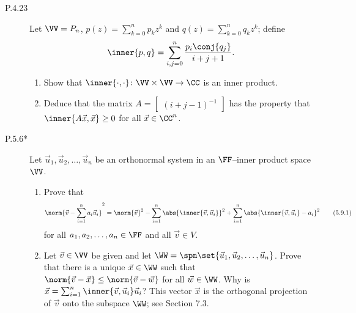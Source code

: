 \documentclass{homework}
\begin{document}
\begin{description}
\item[P.4.23]
  Let \(\VV = P_n\), \(p(z) = \sum_{k=0}^n p_k z^k\) and
  \(q(z) = \sum_{k=0}^n q_k z^k\); define
  \[
    \inner{p, q} = \sum_{i,j=0}^n \frac{p_i \conj{q_j}}{i+j+1}.
  \]
  \begin{enumerate}
  \item Show that
    \(\inner{\cdot, \cdot} \colon \VV \times \VV \to \CC\) is an inner
    product.

    \begin{solution}

    \end{solution}

  \item Deduce that the matrix
    \(A = \begin{bmatrix} (i+j-1)^{-1} \end{bmatrix}\) has the
    property that \(\inner{A \vec x, \vec x} \ge 0\) for all
    \(\vec x \in \CC^n\).

    \begin{solution}

    \end{solution}
  \end{enumerate}


\item[P.5.6*]
  Let \(\vec u_1, \vec u_2, \dots, \vec u_n\) be an orthonormal system
  in an \(\FF\)--inner product space \(\VV\).
  \begin{enumerate}
  \item Prove that
    \[
      \norm{\vec v - \sum_{i=1}^n a_i \vec u_i}^2 =
      \norm{\vec v}^2 -
      \sum_{i=1}^n \abs{\inner{\vec v, \vec u_i}}^2 +
      \sum_{i=1}^n \abs{\inner{\vec v, \vec u_i} - a_i}^2
      \tag{5.9.1}
    \]
    for all \(a_1, a_2, \dots, a_n \in \FF\) and all \(\vec v \in V\).

    \begin{solution}

    \end{solution}

  \item Let \(\vec v \in \VV\) be given and let
    \(\WW = \spn\set{\vec u_1, \vec u_2, \dots, \vec u_n}\).  Prove
    that there is a unique \(\vec x \in \WW\) such that
    \(\norm{\vec v - \vec x} \le \norm{\vec v - \vec w}\) for all
    \(\vec w \in \WW\).  Why is
    \(\vec x = \sum_{i=1}^n \inner{\vec v, \vec u_i} \vec u_i\)?  This
    vector \(\vec x\) is the orthogonal projection of \(\vec v\) onto
    the subspace \(\WW\); see Section
    7.3.  \label{part:unique-parallel}


\end{enumerate}
\end{description}
\end{document}
